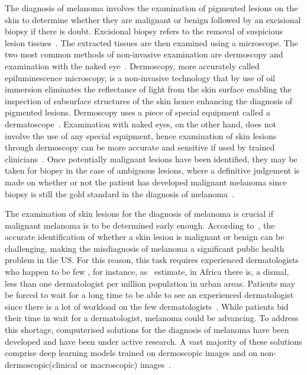 \documentclass[12pt, a4paper]{article}
\begin{document}
The diagnosis of melanoma involves the examination of pigmented lesions on the skin to determine whether they are malignant or benign followed by an excisional biopsy if there is doubt. Excisional biopsy refers to the removal of suspicious lesion tissues~\citep{swanson2002biopsy}. The extracted tissues are then examined using a microscope. The two most common methods of non-invasive examination are dermoscopy and examination with the naked eye~\citep{argenziano2012early}. Dermoscopy, more accurately called epiluminescence microscopy, is a non-invasive technology that by use of oil immersion eliminates the reflectance of light from the skin surface enabling the inspection of subsurface structures of the skin hence enhancing the diagnosis of pigmented lesions. Dermoscopy uses a piece of special equipment called a dermatoscope~\citep{PEHAMBERGER1993S356}. Examination with naked eyes, on the other hand, does not involve the use of any special equipment, hence examination of skin lesions through dermoscopy can be more accurate and sensitive if used by trained clinicians~\citep{jones2019dermoscopy}. Once potentially malignant lesions have been identified, they may be taken for biopsy in the case of ambiguous lesions, where a definitive judgement is made on whether or not the patient has developed malignant melanoma since biopsy is still the gold standard in the diagnosis of melanoma~\citep{fink2017non}.

The examination of skin lesions for the diagnosis of melanoma is crucial if malignant melanoma is to be determined early enough. According to~\cite{bhattacharya2017precision}, the accurate identification of whether a skin lesion is malignant or benign can be challenging, making the misdiagnosis of melanoma a significant public health problem in the US. For this reason, this task requires experienced dermatologists who happen to be few \citep{codella2017deep}, for instance, as~\cite{mosam2021dermatology} estimate, in Africa there is, a dismal, less than one dermatologist per million population in urban areas. Patients may be forced to wait for a long time to be able to see an experienced dermatologist since there is a lot of workload on the few dermatologists~\citep{giavina2020teledermatology}. While patients bid their time in wait for a dermatologist, melanoma could be advancing. To address this shortage, computerised solutions for the diagnosis of melanoma have been developed and have been under active research. A vast majority of these solutions comprise deep learning models trained on dermoscopic images and on non-dermoscopic(clinical or macroscopic) images~\citep{wen2021characteristics}.
\end{document}
